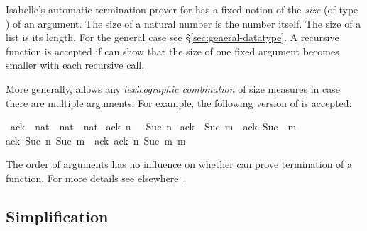 \begin{isabellebody}
\begin{isamarkuptext}
Isabelle's automatic termination prover for  has a
fixed notion of the \emph{size} (of type ) of an
argument. The size of a natural number is the number itself. The size
of a list is its length. For the general case see \S\ref{sec:general-datatype}.
A recursive function is accepted if  can
show that the size of one fixed argument becomes smaller with each
recursive call.

More generally,  allows any \emph{lexicographic
combination} of size measures in case there are multiple
arguments. For example, the following version of  is accepted:%
\end{isamarkuptext}%
\isamarkuptrue%
\isamarkupfalse%
\ ack{}\ {}{}\ {}nat\ {}\ nat\ {}\ nat{}\ \isanewline
{}ack{}\ n\ {}\ {}\ Suc\ n{}\ {}\isanewline
{}ack{}\ {}\ {}Suc\ m{}\ {}\ ack{}\ {}Suc\ {}{}\ m{}\ {}\isanewline
{}ack{}\ {}Suc\ n{}\ {}Suc\ m{}\ {}\ ack{}\ {}ack{}\ n\ {}Suc\ m{}{}\ m{}%
\begin{isamarkuptext}%
The order of arguments has no influence on whether
 can prove termination of a function. For more details
see elsewhere~\cite{bulwahnKN07}.

\subsection{Simplification}
\label{sec:fun-simplification}


\end{isamarkuptext}
\end{isabellebody}
